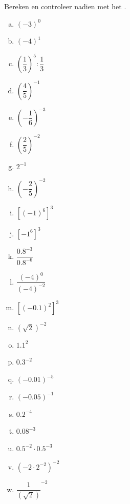 \documentclass[12pt,twoside]{article}
\begin{document}
\begin{oefening}
Bereken en controleer nadien met het .
\begin{multicols}{4}
\begin{enumerate}[(a)]
  \itemsep.5em
  \item $\left(-3\right)^0$
  \item $\left(-4\right)^1$
  \item $\left(\dfrac{1}{3}\right)^5:\dfrac{1}{3}$
  \item $\left(\dfrac{4}{5}\right)^{-1}$
  \item $\left(-\dfrac{1}{6}\right)^{-3}$
  \item $\left(\dfrac{2}{5}\right)^{-2}$
  \item $2^{-1}$
  \item $\left(-\dfrac{2}{5}\right)^{-2}$
  \item $\left[\left(-1\right)^6\right]^3$
  \item $[-1^6]^3$
  \item $\dfrac{0.8^{-3}}{0.8^{-6}}$
  \item $\dfrac{\left(-4\right)^{0}}{\left(-4\right)^{-2}}$
  \item $[\left(-0.1\right)^2]^3$
  \item $\left(\sqrt{2}\right)^{-2}$
  \item $1.1^2$
  \item $0.3^{-2}$
  \item $\left(-0.01\right)^{-5}$
  \item $\left(-0.05\right)^{-1}$
  \item $0.2^{-4}$
  \item $0.08^{-3}$
  \item $0.5^{-2}\cdot0.5^{-3}$
  \item $\left(-2\cdot2^{-2}\right)^{-2}$
  \item $\dfrac{1}{\left(\sqrt{2}\right)}^{-2}$
\end{enumerate}
\end{multicols}
\end{oefening}
\end{document}
